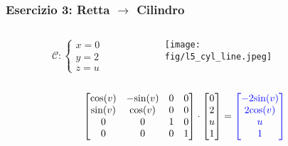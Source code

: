 \documentclass{beamer}
\newcommand{\fig}{./figures} %
\newcommand{\msin}{\mbox{sin}} %
\newcommand{\mcos}{\mbox{cos}} %
\begin{document}
%
%
\begin{frame}
\frametitle{Esercizio 3: Retta $\rightarrow$ Cilindro}
\begin{columns}
\begin{column}{0.58\textwidth}
\begin{displaymath}
\mathcal{C}:
\begin{cases}
x = 0\\
y = 2\\
z = u
\end{cases}
\end{displaymath}
\end{column}
\begin{column}{0.39\textwidth}
\texttt{[image: \\fig/l5\_cyl\_line.jpeg]}

\end{column}
\end{columns}
%
\vspace{0.1\textheight}
\begin{displaymath}
\begin{bmatrix}
\mcos(v) & -\msin(v) & 0 & 0\\
\msin(v) &  \mcos(v) & 0 & 0\\
0        & 0         & 1 & 0\\
0        & 0         & 0 & 1
\end{bmatrix}
\cdot
\begin{bmatrix}
0\\
2\\
u\\
1
\end{bmatrix}
= 
{\color{blue}
\begin{bmatrix}
-2\msin(v)\\
2\mcos(v)\\
u\\
1
\end{bmatrix}
}
\end{displaymath}
\end{frame}
\end{document}

